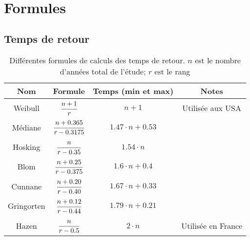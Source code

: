 \chapter{Formules}

\section{Temps de retour}
\begin{table}[H]
    \centering
    \begin{tabular}{cccc}
        \toprule
        \textbf{Nom} & \textbf{Formule}            & \textbf{Temps (min et max)} & \textbf{Notes}     \\
        \toprule
        Weibull      & $\cfrac{n+1}{r}$            & $n+1$                       & Utilisée aux USA   \\
        \midrule
        Médiane      & $\cfrac{n+0.365}{r-0.3175}$ & $1.47 \cdot n + 0.53$       &                    \\
        \midrule
        Hosking      & $\cfrac{n}{r-0.35}$         & $1.54 \cdot n$              &                    \\
        \midrule
        Blom         & $\cfrac{n+0.25}{r-0.375}$   & $1.6 \cdot n + 0.4$         &                    \\
        \midrule
        Cunnane      & $\cfrac{n+0.20}{r-0.40}$    & $1.67 \cdot n + 0.33$       &                    \\
        \midrule
        Gringorten   & $\cfrac{n+0.12}{r-0.44}$    & $1.79 \cdot n + 0.21$       &                    \\
        \arrayrulecolor{red} \midrule
        Hazen        & $\cfrac{n}{r-0.5}$          & $2\cdot n$                  & Utilisée en France \\
        \bottomrule
    \end{tabular}
    \caption{Différentes formules de calculs des temps de retour. $n$ est le nombre d'années total de l'étude; $r$ est le rang}
    \label{tab:formuleTempsRetour}
\end{table}

